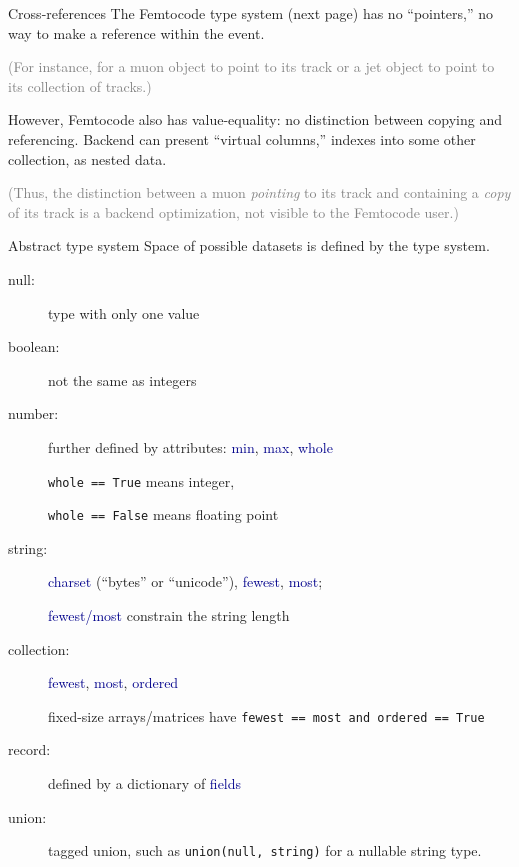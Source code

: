 \documentclass{beamer}
\begin{document}
\begin{frame}{Cross-references}
The Femtocode type system (next page) has no ``pointers,'' no way to make a reference within the event.

\vspace{0.2 cm}
\textcolor{gray}{(For instance, for a muon object to point to its track or a jet object to point to its collection of tracks.)}

\vspace{0.5 cm}
However, Femtocode also has value-equality: no distinction between copying and referencing. Backend can present ``virtual columns,'' indexes into some other collection, as nested data.

\vspace{0.5 cm}
\textcolor{gray}{(Thus, the distinction between a muon {\it pointing} to its track and containing a {\it copy} of its track is a backend optimization, not visible to the Femtocode user.)}
\end{frame}

\begin{frame}{Abstract type system}
\vspace{0.5 cm}
Space of possible datasets is defined by the type system.

\begin{description}
\item[null:] type with only one value
\item[boolean:] not the same as integers
\item[number:] further defined by attributes: \textcolor{darkblue}{min}, \textcolor{darkblue}{max}, \textcolor{darkblue}{whole}

{\tt whole == True} means integer,

{\tt whole == False} means floating point

\item[string:] \textcolor{darkblue}{charset} (``bytes'' or ``unicode''), \textcolor{darkblue}{fewest}, \textcolor{darkblue}{most};

\textcolor{darkblue}{fewest/most} constrain the string length

\item[collection:] \textcolor{darkblue}{fewest}, \textcolor{darkblue}{most}, \textcolor{darkblue}{ordered}

fixed-size arrays/matrices have {\tt fewest == most and ordered == True}

\item[record:] defined by a dictionary of \textcolor{darkblue}{fields}
\item[union:] tagged union, such as {\tt union(null, string)} for a nullable string type.
\end{description}
\end{frame}
\end{document}
